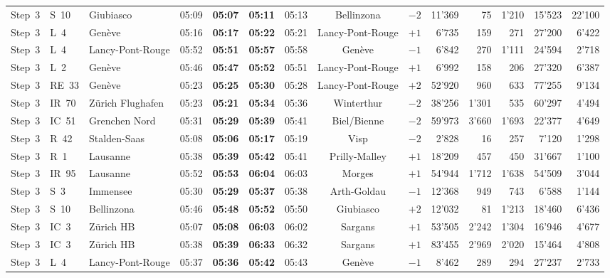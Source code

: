 \documentclass[preprint,12pt]{elsarticle}
\begin{document}
\begin{table}[!htb]
{\begin{tabular}{lllcccccrrrrrr}
Step~3 & S~10 & Giubiasco & 05:09 & \textbf{05:07} & \textbf{05:11} & 05:13 & Bellinzona & \(-2\) & 11'369 & 75 & 1'210 & 15'523 & 22'100 \\
Step~3 & L~4 & Genève & 05:16 & \textbf{05:17} & \textbf{05:22} & 05:21 & Lancy-Pont-Rouge & \(+1\) & 6'735 & 159 & 271 & 27'200 & 6'422 \\
Step~3 & L~4 & Lancy-Pont-Rouge & 05:52 & \textbf{05:51} & \textbf{05:57} & 05:58 & Genève & \(-1\) & 6'842 & 270 & 1'111 & 24'594 & 2'718 \\
Step~3 & L~2 & Genève & 05:46 & \textbf{05:47} & \textbf{05:52} & 05:51 & Lancy-Pont-Rouge & \(+1\) & 6'992 & 158 & 206 & 27'320 & 6'387 \\
Step~3 & RE~33 & Genève & 05:23 & \textbf{05:25} & \textbf{05:30} & 05:28 & Lancy-Pont-Rouge & \(+2\) & 52'920 & 960 & 633 & 77'255 & 9'134 \\
Step~3 & IR~70 & Zürich Flughafen & 05:23 & \textbf{05:21} & \textbf{05:34} & 05:36 & Winterthur & \(-2\) & 38'256 & 1'301 & 535 & 60'297 & 4'494 \\
Step~3 & IC~51 & Grenchen Nord & 05:31 & \textbf{05:29} & \textbf{05:39} & 05:41 & Biel/Bienne & \(-2\) & 59'973 & 3'660 & 1'693 & 22'377 & 4'649 \\
Step~3 & R~42 & Stalden-Saas & 05:08 & \textbf{05:06} & \textbf{05:17} & 05:19 & Visp & \(-2\) & 2'828 & 16 & 257 & 7'120 & 1'298 \\
Step~3 & R~1 & Lausanne & 05:38 & \textbf{05:39} & \textbf{05:42} & 05:41 & Prilly-Malley & \(+1\) & 18'209 & 457 & 450 & 31'667 & 1'100 \\
Step~3 & IR~95 & Lausanne & 05:52 & \textbf{05:53} & \textbf{06:04} & 06:03 & Morges & \(+1\) & 54'944 & 1'712 & 1'638 & 54'509 & 3'044 \\
Step~3 & S~3 & Immensee & 05:30 & \textbf{05:29} & \textbf{05:37} & 05:38 & Arth-Goldau & \(-1\) & 12'368 & 949 & 743 & 6'588 & 1'144 \\
Step~3 & S~10 & Bellinzona & 05:46 & \textbf{05:48} & \textbf{05:52} & 05:50 & Giubiasco & \(+2\) & 12'032 & 81 & 1'213 & 18'460 & 6'436 \\
Step~3 & IC~3 & Zürich HB & 05:07 & \textbf{05:08} & \textbf{06:03} & 06:02 & Sargans & \(+1\) & 53'505 & 2'242 & 1'304 & 16'946 & 4'677 \\
Step~3 & IC~3 & Zürich HB & 05:38 & \textbf{05:39} & \textbf{06:33} & 06:32 & Sargans & \(+1\) & 83'455 & 2'969 & 2'020 & 15'464 & 4'808 \\
Step~3 & L~4 & Lancy-Pont-Rouge & 05:37 & \textbf{05:36} & \textbf{05:42} & 05:43 & Genève & \(-1\) & 8'462 & 289 & 294 & 27'237 & 2'733 \\

\end{tabular}}
\end{table}
\end{document}
